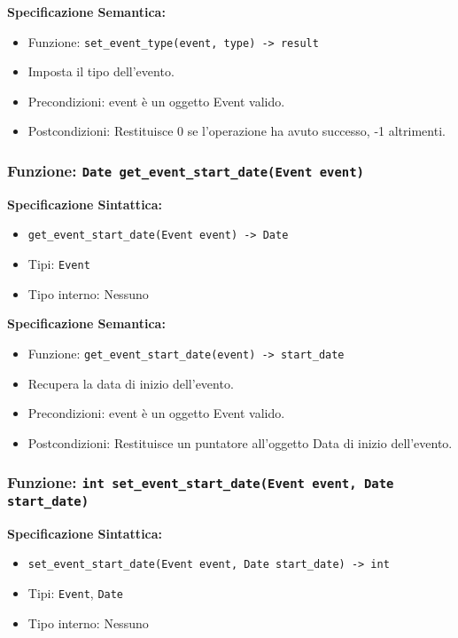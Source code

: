 \documentclass[11pt]{scrartcl} %
\begin{document}
\textbf{Specificazione Semantica:}
\begin{itemize}
\item Funzione: \texttt{set\_event\_type(event, type) -> result}
\item Imposta il tipo dell'evento.
\item Precondizioni: event è un oggetto Event valido.
\item Postcondizioni: Restituisce 0 se l'operazione ha avuto successo, -1 altrimenti.
\end{itemize}

\subsubsection{Funzione: \texttt{Date get\_event\_start\_date(Event event)}}

\textbf{Specificazione Sintattica:}
\begin{itemize}
\item \texttt{get\_event\_start\_date(Event event) -> Date}
\item Tipi: \texttt{Event}
\item Tipo interno: Nessuno
\end{itemize}

\textbf{Specificazione Semantica:}
\begin{itemize}
\item Funzione: \texttt{get\_event\_start\_date(event) -> start\_date}
\item Recupera la data di inizio dell'evento.
\item Precondizioni: event è un oggetto Event valido.
\item Postcondizioni: Restituisce un puntatore all'oggetto Data di inizio dell'evento.
\end{itemize}

\subsubsection{Funzione: \texttt{int set\_event\_start\_date(Event event, Date start\_date)}}

\textbf{Specificazione Sintattica:}
\begin{itemize}
\item \texttt{set\_event\_start\_date(Event event, Date start\_date) -> int}
\item Tipi: \texttt{Event}, \texttt{Date}
\item Tipo interno: Nessuno
\end{itemize}
\end{document}
